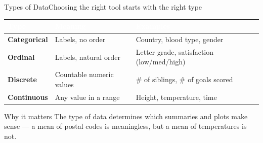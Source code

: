 \documentclass[aspectratio=169,11pt]{beamer}
\begin{document}
\begin{frame}{Types of Data}{Choosing the right tool starts with the right type}
  \small
  \renewcommand{\arraystretch}{1.3}
  \begin{center}
  \begin{tabularx}{\textwidth}{@{}>{\bfseries}l >{\raggedright\arraybackslash}X >{\raggedright\arraybackslash}X@{}}
    \toprule
    \rowcolor{PrimaryDark}
    \textcolor{white}{Type} & \textcolor{white}{Meaning} & \textcolor{white}{Examples} \\
    \midrule
    Categorical & Labels, no order & Country, blood type, gender \\
    \rowcolor{PrimaryLight!25}
    Ordinal & Labels, natural order & Letter grade, satisfaction (low/med/high) \\
    Discrete & Countable numeric values & \# of siblings, \# of goals scored \\
    \rowcolor{PrimaryLight!25}
    Continuous & Any value in a range & Height, temperature, time \\
    \bottomrule
  \end{tabularx}
  \end{center}
  \vspace{0.3em}
  \begin{alertblock}{Why it matters}
    \small The type of data determines which summaries and plots make sense —
    a mean of postal codes is meaningless, but a mean of temperatures is not.
  \end{alertblock}
\end{frame}
\end{document}

